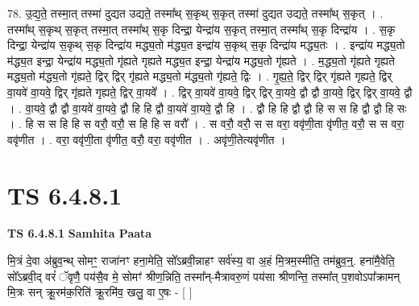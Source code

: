 \documentclass[17pt]{extarticle}
\begin{document}
78. उ॒द्य॒ते॒ तस्मा॒त् तस्मा॑ दुद्यत उद्यते॒ तस्मा᳚थ् स॒कृथ् स॒कृत् तस्मा॑ दुद्यत उद्यते॒ तस्मा᳚थ् स॒कृत् । . तस्मा᳚थ् स॒कृथ् स॒कृत् तस्मा॒त् तस्मा᳚थ् स॒कृ दिन्द्रा॒ येन्द्रा॑य स॒कृत् तस्मा॒त् तस्मा᳚थ् स॒कृ दिन्द्रा॑य । . स॒कृ दिन्द्रा॒ येन्द्रा॑य स॒कृथ् स॒कृ दिन्द्रा॑य मद्ध्य॒तो म॑द्ध्य॒त इन्द्रा॑य स॒कृथ् स॒कृ दिन्द्रा॑य मद्ध्य॒तः । . इन्द्रा॑य मद्ध्य॒तो म॑द्ध्य॒त इन्द्रा॒ येन्द्रा॑य मद्ध्य॒तो गृ॑ह्यते गृह्यते मद्ध्य॒त इन्द्रा॒ येन्द्रा॑य मद्ध्य॒तो गृ॑ह्यते । . म॒द्ध्य॒तो गृ॑ह्यते गृह्यते मद्ध्य॒तो म॑द्ध्य॒तो गृ॑ह्यते॒ द्विर् द्विर् गृ॑ह्यते मद्ध्य॒तो म॑द्ध्य॒तो गृ॑ह्यते॒ द्विः । . गृ॒ह्य॒ते॒ द्विर् द्विर् गृ॑ह्यते गृह्यते॒ द्विर् वा॒यवे॑ वा॒यवे॒ द्विर् गृ॑ह्यते गृह्यते॒ द्विर् वा॒यवे᳚ । . द्विर् वा॒यवे॑ वा॒यवे॒ द्विर् द्विर् वा॒यवे॒ द्वौ द्वौ वा॒यवे॒ द्विर् द्विर् वा॒यवे॒ द्वौ । . वा॒यवे॒ द्वौ द्वौ वा॒यवे॑ वा॒यवे॒ द्वौ हि हि द्वौ वा॒यवे॑ वा॒यवे॒ द्वौ हि । . द्वौ हि हि द्वौ द्वौ हि स स हि द्वौ द्वौ हि सः । . हि स स हि हि स वरौ॒ वरौ॒ स हि हि स वरौ᳚ । . स वरौ॒ वरौ॒ स स वरा॒ ववृ॑णी॒ता वृ॑णीत॒ वरौ॒ स स वरा॒ ववृ॑णीत । . वरा॒ ववृ॑णी॒ता वृ॑णीत॒ वरौ॒ वरा॒ ववृ॑णीत । . अवृ॑णी॒तेत्यवृ॑णीत । \newline
\pagebreak
{}

\section{ TS 6.4.8.1 }

\textbf{TS 6.4.8.1 } \newline
\textbf{Samhita Paata} \newline

मि॒त्रं दे॒वा अ॑ब्रुव॒न्थ् सोमꣳ॒॒ राजा॑नꣳ हना॒मेति॒ सो᳚ऽब्रवी॒न्नाहꣳ सर्व॑स्य॒ वा अ॒हं मि॒त्रम॒स्मीति॒ तम॑ब्रुव॒न्॒. हना॑मै॒वेति॒ सो᳚ऽब्रवी॒द् वरं॑ ॅवृणै॒ पय॑सै॒व मे॒ सोमꣳ॑ श्रीण॒न्निति॒ तस्मा᳚न्-मैत्रावरु॒णं पय॑सा श्रीणन्ति॒ तस्मा᳚त् प॒शवोऽपा᳚क्रामन् मि॒त्रः सन् क्रू॒रम॑क॒रिति॑ क्रू॒रमि॑व॒ खलु॒ वा ए॒षः - [  ] \newline
\end{document}
